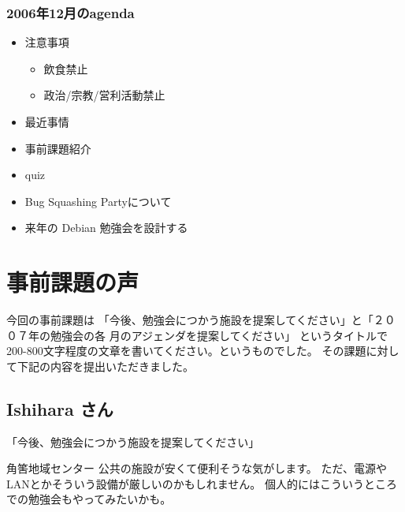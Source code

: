 \documentclass[cjk,dvipdfmx]{beamer}
\begin{document}
\begin{frame}
 \frametitle{2006年12月のagenda}
\begin{minipage}[t]{0.4\hsize}
  \begin{itemize}
  \item 注意事項
	\begin{itemize}
	 \item 飲食禁止
	 \item 政治/宗教/営利活動禁止
	\end{itemize}
  \item 最近事情
  \item 事前課題紹介
  \item quiz
 \end{itemize}
\end{minipage} 
\begin{minipage}[t]{0.4\hsize}
 \begin{itemize}
  \item Bug Squashing Partyについて
  \item 来年の Debian 勉強会を設計する
 \end{itemize}
\end{minipage}
\end{frame}

\section{事前課題の声}
\begin{frame}

 今回の事前課題は
「今後、勉強会につかう施設を提案してください」と「２００７年の勉強会の各
 月のアジェンダを提案してください」
 というタイトルで200-800文字程度の文章を書いてください。というものでした。
 その課題に対して下記の内容を提出いただきました。
\end{frame}


\subsection{Ishihara さん}

\begin{frame}{「今後、勉強会につかう施設を提案してください」}

角筈地域センター
公共の施設が安くて便利そうな気がします。
ただ、電源やLANとかそういう設備が厳しいのかもしれません。
個人的にはこういうところでの勉強会もやってみたいかも。
\end{frame}
\end{document}
